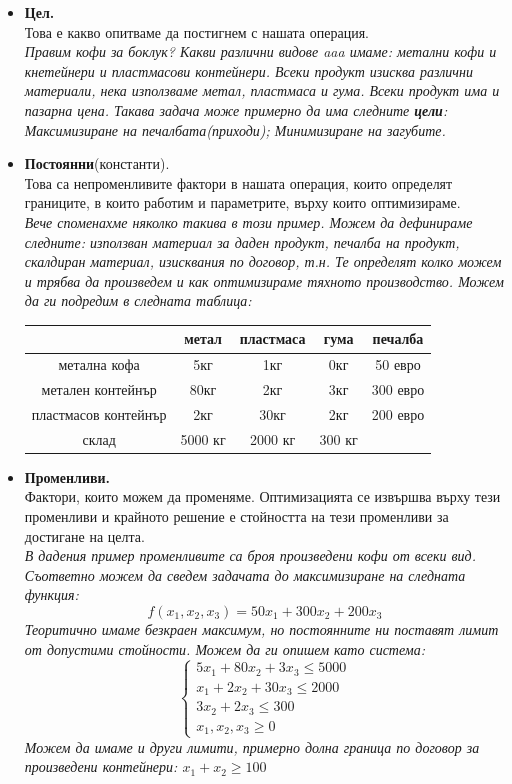 \documentclass[12pt, a4paper]{article}
\begin{document}
\begin{itemize}
\item \textbf{Цел.}\\
Това е какво опитваме да постигнем с нашата операция.\\
\textit{Правим кофи за боклук? Какви различни видове aaa имаме: метални кофи и кнетейнери и пластмасови контейнери. Всеки продукт изисква различни материали, нека използваме метал, пластмаса и гума. Всеки продукт има и пазарна цена. Такава задача може примерно да има следните \textbf{цели}: Максимизиране на печалбата(приходи); Минимизиране на загубите.}
\item \textbf{Постоянни}(константи).\\
Това са непроменливите фактори в нашата операция, които определят границите, в които работим и параметрите, върху които оптимизираме.\\
\textit{Вече споменахме няколко такива в този пример. Можем да дефинираме следните: използван материал за даден продукт, печалба на продукт, скалдиран материал, изисквания по договор, т.н. Те определят колко можем и трябва да произведем и как оптимизираме тяхното производство. Можем да ги подредим в следната таблица:}
\begin{center}
\begin{tabular}{|c||c|c|c|c|}
\hline
 & метал & пластмаса & гума & печалба\\\hline\hline
метална кофа & 5кг & 1кг & 0кг & 50 евро\\\hline
метален контейнър & 80кг & 2кг & 3кг & 300 евро\\\hline
пластмасов контейнър & 2кг & 30кг & 2кг & 200 евро\\\hline
склад & 5000 кг & 2000 кг & 300 кг&\\\hline
\end{tabular}
\end{center}

\item \textbf{Променливи.}\\
Фактори, които можем да променяме. Оптимизацията се извършва върху тези променливи и крайното решение е стойността на тези променливи за достигане на целта.\\
\textit{В дадения пример променливите са броя произведени кофи от всеки вид. Съответно можем да сведем задачата до максимизиране на следната функция:}
\[f(x_1,x_2,x_3)=50x_1 + 300x_2+200x_3\]
\textit{Теоритично имаме безкраен максимум, но постоянните ни поставят лимит от допустими стойности. Можем да ги опишем като система:}
\[
\begin{cases} 
5x_1+80x_2+3x_3\leq5000 \\ 
x_1+2x_2+30x_3\leq2000 \\
3x_2+2x_3\leq300 \\
x_1, x_2, x_3 \geq 0
\end{cases}
\]
\textit{Можем да имаме и други лимити, примерно долна граница по договор за произведени контейнери: $x_1 + x_2 \geq 100$}
\end{itemize}
\end{document}
